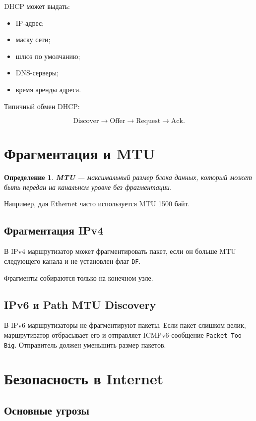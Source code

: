 \documentclass[12pt,a4paper]{article}
\newtheorem{definition}{Определение}
\begin{document}
DHCP может выдать:

\begin{itemize}
    \item IP-адрес;
    \item маску сети;
    \item шлюз по умолчанию;
    \item DNS-серверы;
    \item время аренды адреса.
\end{itemize}

Типичный обмен DHCP:

\[
\text{Discover} \rightarrow \text{Offer} \rightarrow \text{Request} \rightarrow \text{Ack}.
\]

\section{Фрагментация и MTU}

\begin{definition}
\textbf{MTU} --- максимальный размер блока данных, который может быть передан на канальном уровне без фрагментации.
\end{definition}

Например, для Ethernet часто используется MTU 1500 байт.

\subsection{Фрагментация IPv4}

В IPv4 маршрутизатор может фрагментировать пакет, если он больше MTU следующего канала и не установлен флаг \texttt{DF}.

Фрагменты собираются только на конечном узле.

\subsection{IPv6 и Path MTU Discovery}

В IPv6 маршрутизаторы не фрагментируют пакеты. Если пакет слишком велик, маршрутизатор отбрасывает его и отправляет ICMPv6-сообщение \texttt{Packet Too Big}. Отправитель должен уменьшить размер пакетов.

\section{Безопасность в Internet}

\subsection{Основные угрозы}
\end{document}
